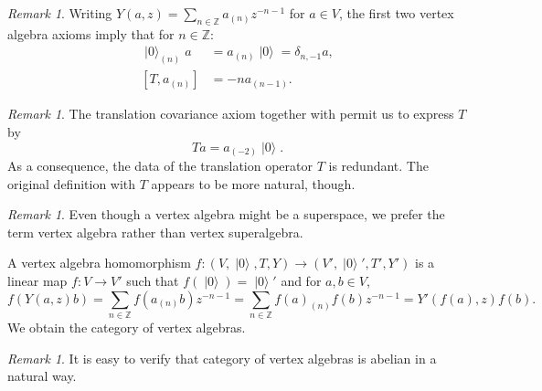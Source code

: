 \documentclass[a4paper, 12pt, reqno]{amsart}
\theoremstyle{remark}
\newtheorem{remark}[theorem]{Remark}
\numberwithin{equation}{subsection}
\DeclareMathOperator{\vac}{|0\rangle}
\begin{document}
\begin{remark}
  \label{rmk:7}
  Writing $Y(a, z) = \sum_{n \in \mathbb{Z}}a_{(n)}z^{-n - 1}$ for $a \in V$, the first two vertex algebra axioms imply that for $n \in \mathbb{Z}$:
  \begin{align*}
    \vac_{(n)}a &= a_{(n)}\vac = \delta_{n, -1}a, \\  
    [T, a_{(n)}] &= -na_{(n - 1)}.
  \end{align*}
\end{remark}

\begin{remark}
  \label{rmk:8}
  The translation covariance axiom together with  permit us to express $T$ by
  \begin{equation}
    \label{eq:14}
    Ta = a_{(-2)}\vac.
  \end{equation}
  As a consequence, the data of the translation operator $T$ is redundant.
  The original definition with $T$ appears to be more natural, though.
\end{remark}

\begin{remark}
  \label{rmk:9}
  Even though a vertex algebra might be a superspace, we prefer the term vertex algebra rather than vertex superalgebra.
\end{remark}

A vertex algebra homomorphism $f: (V, \vac, T, Y) \to (V', \vac', T', Y')$ is a linear map $f: V \to V'$ such that $f(\vac) = \vac'$ and for $a, b \in V$,
\begin{equation*}
  f(Y(a, z)b) = \sum_{n \in \mathbb{Z}}f(a_{(n)}b)z^{-n - 1} = \sum_{n \in \mathbb{Z}}f(a)_{(n)}f(b)z^{-n - 1} = Y'(f(a), z)f(b).
\end{equation*}
We obtain the category of vertex algebras.

\begin{remark}
  \label{rmk:10}
  It is easy to verify that category of vertex algebras is abelian in a natural way.
\end{remark}
\end{document}
